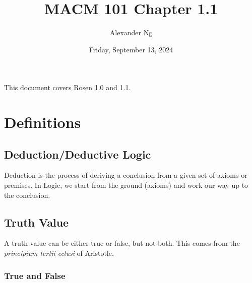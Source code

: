 \documentclass[12pt]{article}
\begin{document}
\title{MACM 101 Chapter 1.1}
\author{Alexander Ng}
\date{Friday, September 13, 2024}

\maketitle


%
%

This document covers Rosen 1.0 and 1.1.

\pagebreak
\section{Definitions}

\subsection{Deduction/Deductive Logic}

Deduction is the process of deriving a conclusion from a given set of axioms 
or premises. In Logic, we start from the ground (axioms) and work our way up to
the conclusion.

\subsection{Truth Value}

A truth value can be either true or false, but not both. This comes from the
\textit{principium tertii eclusi} of Aristotle.

\subsubsection{True and False}
\end{document}
